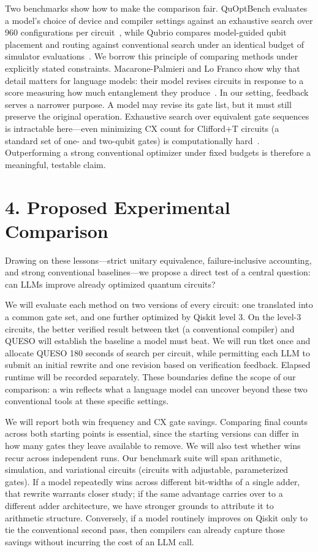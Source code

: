 \documentclass[12pt]{article}
\begin{document}
Two benchmarks show how to make the comparison fair. QuOptBench evaluates a model’s choice of device and compiler
settings against an exhaustive search over 960 configurations per circuit~\cite{quoptbench}, while
Qubrio compares model-guided qubit placement and routing against conventional search under an identical
budget of simulator evaluations~\cite{qubrio}. We borrow this principle of comparing methods under
explicitly stated constraints. Macarone-Palmieri and Lo Franco show why that detail matters for
language models: their model revises circuits in response to a score measuring how much entanglement
they produce~\cite{testtime}. In our setting, feedback serves a narrower purpose. A model may revise
its gate list, but it must still preserve the original operation. Exhaustive search over equivalent
gate sequences is intractable here—even
minimizing CX count for Clifford+T circuits (a standard set of one- and two-qubit gates) is
computationally hard~\cite{wetering-amy}. Outperforming a strong conventional optimizer under fixed
budgets is therefore a meaningful, testable claim.

\section{4. Proposed Experimental Comparison}

Drawing on these lessons—strict unitary equivalence, failure-inclusive accounting, and strong
conventional baselines—we propose a direct test of a central question: can LLMs improve already
optimized quantum circuits?

We will evaluate each method on two versions of every circuit: one translated into a common gate set,
and one further optimized by Qiskit level 3. On the level-3 circuits, the better verified result between
tket (a conventional compiler) and QUESO will establish the baseline a model must beat. We will run tket
once and allocate QUESO 180 seconds of search per circuit, while permitting each LLM to submit an
initial rewrite and one revision based on verification feedback. Elapsed runtime will be recorded
separately. These boundaries define the scope of our comparison: a win reflects what a language model
can uncover beyond these two conventional tools at these specific settings.

We will report both win frequency and CX gate savings. Comparing final counts across both starting
points is essential, since the starting versions can differ in how many gates they leave available to
remove. We will also test whether wins recur across independent runs. Our benchmark suite will span
arithmetic, simulation, and variational circuits (circuits with adjustable, parameterized gates). If a
model repeatedly wins across different bit-widths of a single adder, that rewrite warrants closer study;
if the same advantage carries over to a different adder architecture, we have stronger grounds to
attribute it to arithmetic structure. Conversely, if a model routinely improves on Qiskit only to tie
the conventional second pass, then compilers can already capture those savings without incurring the
cost of an LLM call.
\end{document}
